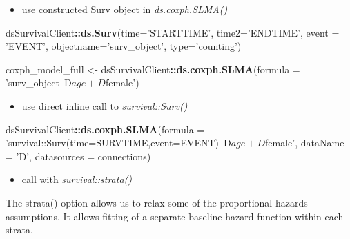 \documentclass[
]{book}
\newenvironment{Shaded}{\begin{snugshade}}{\end{snugshade}}
\newcommand{\DataTypeTok}[1]{\textcolor[rgb]{0.13,0.29,0.53}{#1}}
\newcommand{\KeywordTok}[1]{\textcolor[rgb]{0.13,0.29,0.53}{\textbf{#1}}}
\newcommand{\NormalTok}[1]{#1}
\newcommand{\OperatorTok}[1]{\textcolor[rgb]{0.81,0.36,0.00}{\textbf{#1}}}
\newcommand{\StringTok}[1]{\textcolor[rgb]{0.31,0.60,0.02}{#1}}
\providecommand{\tightlist}{%
  \setlength{\itemsep}{0pt}\setlength{\parskip}{0pt}}
\begin{document}
\begin{itemize}
\tightlist
\item
  use constructed Surv object in \emph{ds.coxph.SLMA()}
\end{itemize}

\begin{Shaded}
\begin{Highlighting}[]
\NormalTok{dsSurvivalClient}\OperatorTok{::}\KeywordTok{ds.Surv}\NormalTok{(}\DataTypeTok{time=}\StringTok{'STARTTIME'}\NormalTok{, }\DataTypeTok{time2=}\StringTok{'ENDTIME'}\NormalTok{, }
                      \DataTypeTok{event =} \StringTok{'EVENT'}\NormalTok{, }\DataTypeTok{objectname=}\StringTok{'surv_object'}\NormalTok{,}
                      \DataTypeTok{type=}\StringTok{'counting'}\NormalTok{)}
              
\NormalTok{coxph_model_full <-}\StringTok{ }\NormalTok{dsSurvivalClient}\OperatorTok{::}\KeywordTok{ds.coxph.SLMA}\NormalTok{(}\DataTypeTok{formula =} \StringTok{'surv_object~D$age+D$female'}\NormalTok{)}
\end{Highlighting}
\end{Shaded}

\begin{itemize}
\tightlist
\item
  use direct inline call to \emph{survival::Surv()}
\end{itemize}

\begin{Shaded}
\begin{Highlighting}[]
\NormalTok{dsSurvivalClient}\OperatorTok{::}\KeywordTok{ds.coxph.SLMA}\NormalTok{(}\DataTypeTok{formula =} \StringTok{'survival::Surv(time=SURVTIME,event=EVENT)~D$age+D$female'}\NormalTok{, }
                                \DataTypeTok{dataName =} \StringTok{'D'}\NormalTok{, }
                                \DataTypeTok{datasources =}\NormalTok{ connections)}
\end{Highlighting}
\end{Shaded}

\begin{itemize}
\tightlist
\item
  call with \emph{survival::strata()}
\end{itemize}

The strata() option allows us to relax some of the proportional hazards assumptions. It allows fitting of a separate baseline hazard function within each strata.

\begin{Shaded}
\end{Shaded}
\end{document}
